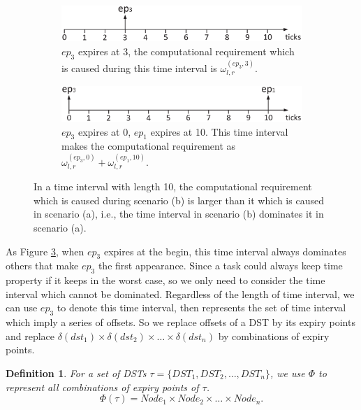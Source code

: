 \documentclass[conference]{IEEEtran}
\newtheorem{definition}{Definition}
\begin{document}
\begin{figure}  
  \centering
  \begin{subfigure}[t]{3.33in}
    \centering
    \includegraphics[scale=.34]{graphics/figure_combina2.eps}
    \caption{$ep_3$ expires at 3, the computational requirement which is caused during this time interval is $\omega_{l,r}^{(ep_3,3)}.$}\label{figure_combination1}
  \end{subfigure}
  \quad
  \begin{subfigure}[t]{3.33in}
    \centering
    \includegraphics[scale=.34]{graphics/figure_combina1.eps}
    \caption{$ep_3$ expires at 0, $ep_1$ expires at 10. This time interval makes the computational requirement as $\omega_{l,r}^{(ep_3,0)}+\omega_{l,r}^{(ep_1,10)}$.}\label{figure_combination2}
  \end{subfigure}
  \caption{In a time interval with length 10, the computational requirement which is caused during scenario (b) is larger than it which is caused in scenario (a), i.e., the time interval in scenario (b) dominates it in scenario (a).}\label{figure_combination}
\end{figure}
As Figure \ref{figure_combination}, when $ep_3$ expires at the begin, this time interval always dominates others that make $ep_3$ the first appearance. Since a task could always keep time property if it keeps in the worst case, so we only need to consider the time interval which cannot be dominated. Regardless of the length of time interval, we can use $ep_3$ to denote this time interval, then represents the set of time interval which imply a series of offsets. So we replace offsets of a DST by its expiry points and replace $\delta(dst_1)\times\delta(dst_2)\times\dots\times\delta(dst_n)$ by combinations of expiry points.
\begin{definition}
For a set of DSTs $\tau=\{DST_1,DST_2,\dots,DST_n\}$, we use $\Phi$ to represent all combinations of expiry points of $\tau$.
\begin{equation}
  \Phi(\tau)=Node_1 \times Node_2\times\dots\times Node_n.
\end{equation}\label{equation_combination}
\end{definition}
\end{document}
